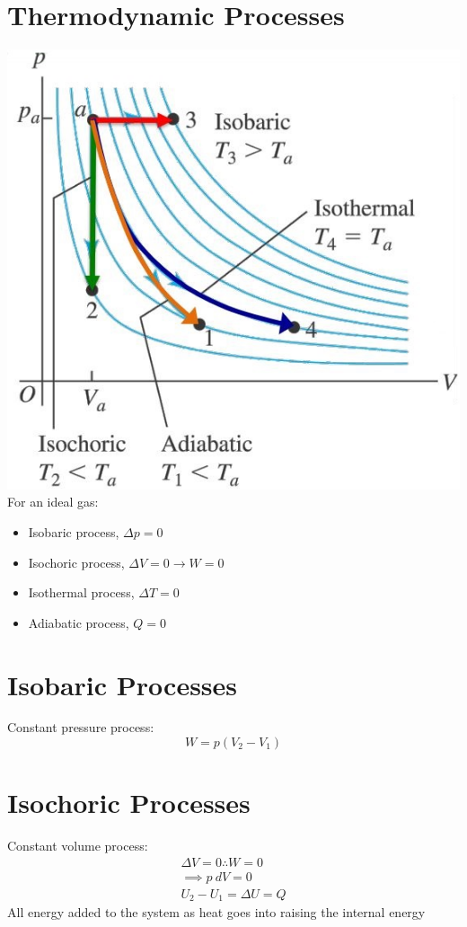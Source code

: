 \documentclass[a4paper, 11pt, fleqn, normalem]{report}
\begin{document}
\section{Thermodynamic Processes}
\includegraphics[scale=0.7]{Processes.jpg} \\
For an ideal gas:
\begin{itemize}
	\item[] Isobaric process, ${\Delta}p = 0$
	\item[] Isochoric process, ${\Delta}V = 0 \rightarrow W = 0$
	\item[] Isothermal process, ${\Delta}T = 0$
	\item[] Adiabatic process, $Q = 0$
\end{itemize}

\section{Isobaric Processes}
Constant pressure process:
\begin{equation*}
	W = p(V_{2} - V_{1})
\end{equation*}

\section{Isochoric Processes}
Constant volume process:
\begin{gather*}
	{\Delta}V = 0 \therefore W = 0 \\
	\implies p\:dV = 0 \\
	U_{2} - U_{1} = {\Delta}U = Q
\end{gather*}
All energy added to the system as heat goes into raising the internal energy
\end{document}
